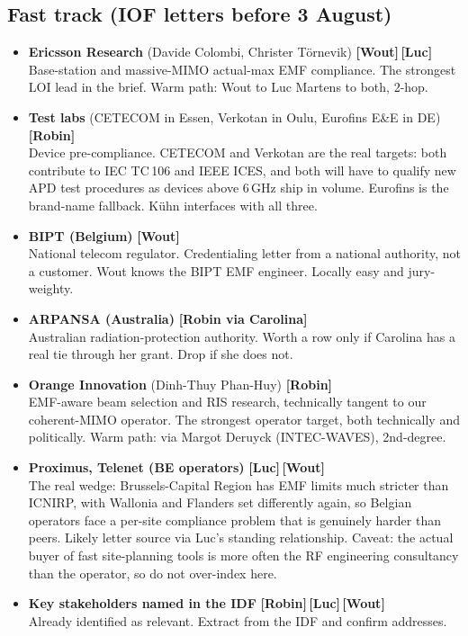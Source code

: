 \documentclass[11pt,a4paper]{article}
\newcommand{\owner}[1]{\textbf{[#1]}}
\begin{document}
\subsection*{Fast track (IOF letters before 3 August)}
\begin{itemize}[itemsep=0.7em, leftmargin=1.4em]
  \item \textbf{Ericsson Research} (Davide Colombi, Christer T\"ornevik) \quad \owner{Wout}\,\owner{Luc}\\
  Base-station and massive-MIMO actual-max EMF compliance. The strongest LOI lead in the brief. Warm path: Wout to Luc Martens to both, 2-hop.

  \item \textbf{Test labs} (CETECOM in Essen, Verkotan in Oulu, Eurofins E\&E in DE) \quad \owner{Robin}\\
  Device pre-compliance. CETECOM and Verkotan are the real targets: both contribute to IEC TC\,106 and IEEE ICES, and both will have to qualify new APD test procedures as devices above 6\,GHz ship in volume. Eurofins is the brand-name fallback. K\"uhn interfaces with all three.

  \item \textbf{BIPT (Belgium)} \quad \owner{Wout}\\
  National telecom regulator. Credentialing letter from a national authority, not a customer. Wout knows the BIPT EMF engineer. Locally easy and jury-weighty.

  \item \textbf{ARPANSA (Australia)} \quad \owner{Robin via Carolina}\\
  Australian radiation-protection authority. Worth a row only if Carolina has a real tie through her grant. Drop if she does not.

  \item \textbf{Orange Innovation} (Dinh-Thuy Phan-Huy) \quad \owner{Robin}\\
  EMF-aware beam selection and RIS research, technically tangent to our coherent-MIMO operator. The strongest operator target, both technically and politically. Warm path: via Margot Deruyck (INTEC-WAVES), 2nd-degree.

  \item \textbf{Proximus, Telenet (BE operators)} \quad \owner{Luc}\,\owner{Wout}\\
  The real wedge: Brussels-Capital Region has EMF limits much stricter than ICNIRP, with Wallonia and Flanders set differently again, so Belgian operators face a per-site compliance problem that is genuinely harder than peers. Likely letter source via Luc's standing relationship. Caveat: the actual buyer of fast site-planning tools is more often the RF engineering consultancy than the operator, so do not over-index here.

  \item \textbf{Key stakeholders named in the IDF} \quad \owner{Robin}\,\owner{Luc}\,\owner{Wout}\\
  Already identified as relevant. Extract from the IDF and confirm addresses.
\end{itemize}
\end{document}
